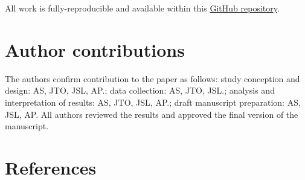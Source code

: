\documentclass[10pt,letterpaper]{article}
\begin{document}
All work is fully-reproducible and available within this
\href{https://github.com/soukhova/Multimodal-spatial-availability}{GitHub
repository}.

\hypertarget{author-contributions}{%
\section{Author contributions}\label{author-contributions}}

The authors confirm contribution to the paper as follows: study
conception and design: AS, JTO, JSL, AP.; data collection: AS, JTO,
JSL.; analysis and interpretation of results: AS, JTO, JSL, AP.; draft
manuscript preparation: AS, JSL, AP. All authors reviewed the results
and approved the final version of the manuscript.

\hypertarget{references}{%
\section*{References}\label{references}}
\end{document}

